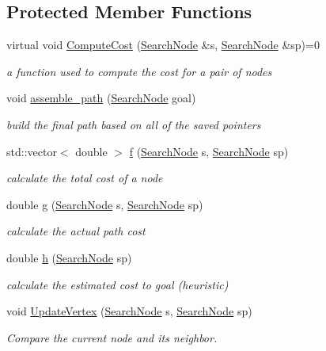 \subsection*{Protected Member Functions}
\begin{DoxyCompactItemize}
\item 
virtual void \hyperlink{classhsearch_1_1HSearch_a5d325955c4faedaca0c68155fd1f7e69}{Compute\+Cost} (\hyperlink{structhsearch_1_1SearchNode}{Search\+Node} \&s, \hyperlink{structhsearch_1_1SearchNode}{Search\+Node} \&sp)=0
\begin{DoxyCompactList}\small\item\em a function used to compute the cost for a pair of nodes \end{DoxyCompactList}\item 
void \hyperlink{classhsearch_1_1HSearch_ac94c08c0f0d4cc3076f01d70c6cd7679}{assemble\+\_\+path} (\hyperlink{structhsearch_1_1SearchNode}{Search\+Node} goal)
\begin{DoxyCompactList}\small\item\em build the final path based on all of the saved pointers \end{DoxyCompactList}\item 
std\+::vector$<$ double $>$ \hyperlink{classhsearch_1_1HSearch_a6ca884af67da489fa1b20592abc1dbba}{f} (\hyperlink{structhsearch_1_1SearchNode}{Search\+Node} s, \hyperlink{structhsearch_1_1SearchNode}{Search\+Node} sp)
\begin{DoxyCompactList}\small\item\em calculate the total cost of a node \end{DoxyCompactList}\item 
double \hyperlink{classhsearch_1_1HSearch_a687960c8dcfc61e16613a72a4ff1c14d}{g} (\hyperlink{structhsearch_1_1SearchNode}{Search\+Node} s, \hyperlink{structhsearch_1_1SearchNode}{Search\+Node} sp)
\begin{DoxyCompactList}\small\item\em calculate the actual path cost \end{DoxyCompactList}\item 
double \hyperlink{classhsearch_1_1HSearch_aa09bc55605f454f822892a40e580b164}{h} (\hyperlink{structhsearch_1_1SearchNode}{Search\+Node} sp)
\begin{DoxyCompactList}\small\item\em calculate the estimated cost to goal (heuristic) \end{DoxyCompactList}\item 
void \hyperlink{classhsearch_1_1HSearch_a93f71cc1b8e8b126ef61ab2a1a599498}{Update\+Vertex} (\hyperlink{structhsearch_1_1SearchNode}{Search\+Node} s, \hyperlink{structhsearch_1_1SearchNode}{Search\+Node} sp)
\begin{DoxyCompactList}\small\item\em Compare the current node and its neighbor. \end{DoxyCompactList}\end{DoxyCompactItemize}
